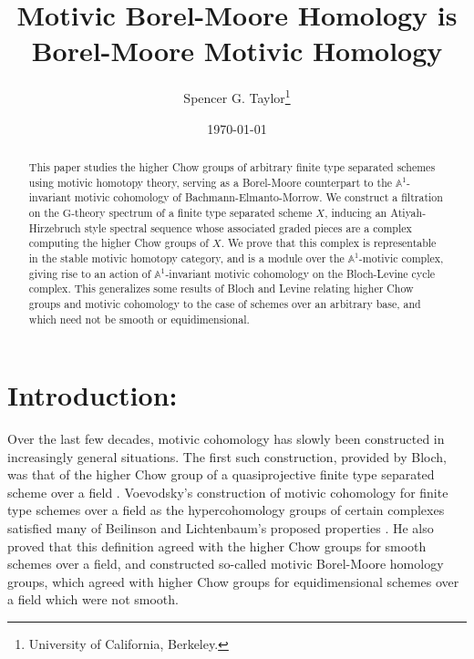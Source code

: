 \documentclass[11pt, twoside]{article}
\title{Motivic Borel-Moore Homology is Borel-Moore Motivic Homology}
\author{Spencer G. Taylor\footnote{University of California, Berkeley. }}
\date{\today}
\numberwithin{equation}{section}
\theoremstyle{definition}
\newcommand{\bb}[1]{\mathbb{#1}}
\newcommand{\G}{\mathrm{G}}
\begin{document}
\let\placephi\phi
\let\phi\varphi
\let\varphi\placephi
\let\tilde\widetilde
\let\hat\widehat
\maketitle

\begin{abstract}
This paper studies the higher Chow groups of arbitrary finite type separated schemes using motivic homotopy theory, serving as a Borel-Moore counterpart to the \(\bb{A}^1\)-invariant motivic cohomology of Bachmann-Elmanto-Morrow. We construct a filtration on the \(\G\)-theory spectrum of a finite type separated scheme \(X\), inducing an Atiyah-Hirzebruch style spectral sequence whose associated graded pieces are a complex computing the higher Chow groups of \(X\). We prove that this complex is representable in the stable motivic homotopy category, and is a module over the \(\bb{A}^1\)-motivic complex, giving rise to an action of \(\bb{A}^1\)-invariant motivic cohomology on the Bloch-Levine cycle complex. This generalizes some results of Bloch and Levine relating higher Chow groups and motivic cohomology to the case of schemes over an arbitrary base, and which need not be smooth or equidimensional.
\end{abstract}

\tableofcontents

\section{Introduction:}
Over the last few decades, motivic cohomology has slowly been constructed in increasingly general situations. The first such construction, provided by Bloch, was that of the higher Chow group of a quasiprojective finite type separated scheme over a field  \cite{Blo}. Voevodsky's construction of motivic cohomology for finite type schemes over a field as the hypercohomology groups of certain complexes \cite{MVW} satisfied many of Beilinson and Lichtenbaum's proposed properties \cite{BeiMot, LichZet}. He also proved that this definition agreed with the higher Chow groups for smooth schemes over a field, and constructed so-called motivic Borel-Moore homology groups, which agreed with higher Chow groups for equidimensional schemes over a field which were not smooth.
\end{document}
